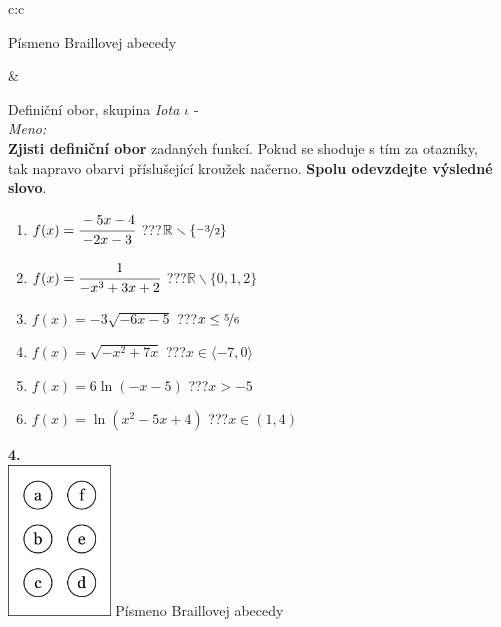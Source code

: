 \documentclass[10pt]{report}
\begin{document}
\begin{tabular}{c:c}
\begin{minipage}[c][99mm][t]{0.49\linewidth}
\begin{center}
\begin{minipage}{0.20\linewidth}
\begin{center}
{\small Písmeno Braillovej abecedy}
\end{center}
\end{minipage}
\end{center}
\end{minipage}
&
\begin{minipage}[c][99mm][t]{0.49\linewidth}
\begin{center}
\vspace{7mm}
{\huge Definiční obor, skupina \textit{Iota $\iota$} -}\\[4.5mm]
\textit{Meno:}\phantom{xxxxxxxxxxxxxxxxxxxxxxxxxxxxxxxxxxxxxxxxxxxxxxxxxxxxxxxxxxxxxxxxx}\\[3.5mm]
\textbf{Zjisti definiční obor} zadaných funkcí. Pokud se shoduje s tím za otazníky,\\tak napravo obarvi příslušející kroužek načerno. \textbf{Spolu odevzdejte výsledné slovo}.\\[3mm]
\begin{minipage}{0.77\linewidth}
\begin{center}
\begin{varwidth}{\textwidth}
\begin{enumerate}
\normalsize
\item $f(x)=\cfrac{-5x-4}{-2x-3}$\quad \dotfill\; ???\;\dotfill \quad $\mathbb{R}\smallsetminus\{\nicefrac{-3}{2}\}$
\item $f(x)=\cfrac{1}{-x^3+3x+2}$\quad \dotfill\; ???\;\dotfill \quad $\mathbb{R}\smallsetminus\{0,1,2\}$
\item $f(x)=-3\sqrt{-6x-5}$\quad \dotfill\; ???\;\dotfill \quad $x\leq\nicefrac{5}{6}$
\item $f(x)=\sqrt{-x^2+7x}$\quad \dotfill\; ???\;\dotfill \quad $x\in\langle-7 , 0\rangle$
\item $f(x)=6\ln{(-x-5)}$\quad \dotfill\; ???\;\dotfill \quad $x>-5$
\item $f(x)=\ln{(x^2-5x+4)}$\quad \dotfill\; ???\;\dotfill \quad $x\in(1 , 4)$
\end{enumerate}
\end{varwidth}
\end{center}
\end{minipage}
\begin{minipage}{0.20\linewidth}
\begin{center}
{\Huge\bfseries 4.} \\[2mm]
\includegraphics[height=40mm]{../images/braille.png}
{\small Písmeno Braillovej abecedy}
\end{center}
\end{minipage}
\end{center}
\end{minipage}
%
\end{tabular}
\end{document}
